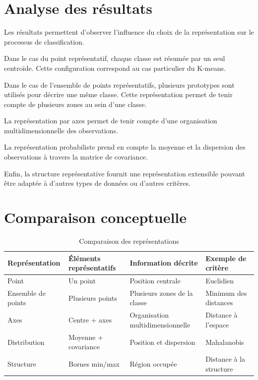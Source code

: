 \documentclass[12pt,a4paper]{report}
\begin{document}
\section{Analyse des résultats}

Les résultats permettent d'observer l'influence du choix de la
représentation sur le processus de classification.

Dans le cas du point représentatif, chaque classe est résumée par
un seul centroïde. Cette configuration correspond au cas particulier
du K-means.

Dans le cas de l'ensemble de points représentatifs, plusieurs
prototypes sont utilisés pour décrire une même classe. Cette
représentation permet de tenir compte de plusieurs zones au sein
d'une classe.

La représentation par axes permet de tenir compte d'une organisation
multidimensionnelle des observations.

La représentation probabiliste prend en compte la moyenne et la
dispersion des observations à travers la matrice de covariance.

Enfin, la structure représentative fournit une représentation
extensible pouvant être adaptée à d'autres types de données ou
d'autres critères.

\section{Comparaison conceptuelle}

\begin{table}[H]
\centering
\caption{Comparaison des représentations}
\label{tab:comparaison}
\begin{tabular}{|l|p{3.5cm}|p{4cm}|p{3cm}|}
\hline
\textbf{Représentation} &
\textbf{Éléments représentatifs} &
\textbf{Information décrite} &
\textbf{Exemple de critère} \\
\hline
Point &
Un point &
Position centrale &
Euclidien \\
\hline
Ensemble de points &
Plusieurs points &
Plusieurs zones de la classe &
Minimum des distances \\
\hline
Axes &
Centre + axes &
Organisation multidimensionnelle &
Distance à l'espace \\
\hline
Distribution &
Moyenne + covariance &
Position et dispersion &
Mahalanobis \\
\hline
Structure &
Bornes min/max &
Région occupée &
Distance à la structure \\
\hline
\end{tabular}
\end{table}
\end{document}

